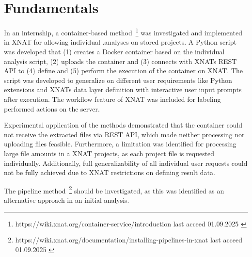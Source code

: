 


\section{Fundamentals}

In an internship, a container-based method~\footnote{https://wiki.xnat.org/container-service/introduction {last acceed 01.09.2025 }} was investigated and implemented in XNAT for allowing individual .analyses on stored projects. A Python script was developed that (1) creates a Docker container based on the individual analysis script, (2) uploads the container and (3) connects with XNATs REST API to (4) define and (5) perform the execution of the container on XNAT. The script was developed to generalize on different user requirements like Python extensions and XNATs data layer definition with interactive user input prompts after execution. The workflow feature of XNAT was included for labeling performed actions on the server.

Experimental application of the methods demonstrated that the container could not receive the extracted files via REST API, which made neither processing nor uploading files feasible. Furthermore, a limitation was identified for processing large file amounts in a XNAT projects, as each project file is requested individually. Additionally, full generalizability of all individual user requests could not be fully achieved due to XNAT restrictions on defining result data. 

The pipeline method~\footnote{https://wiki.xnat.org/documentation/installing-pipelines-in-xnat {last acceed 01.09.2025 }} should be investigated, as this was identified as an alternative approach in an initial analysis.

  





